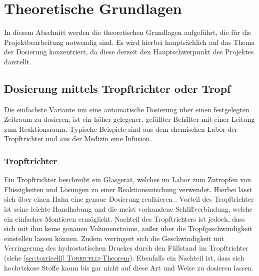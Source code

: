 \section{Theoretische Grundlagen}
\label{sec:physik}
In diesem Abschnitt werden die theoretischen Grundlagen aufgeführt, die für die Projektbearbeitung notwendig sind. Es wird hierbei hauptsächlich auf das Thema der Dosierung konzentriert, da diese derzeit den Hauptschwerpunkt des Projektes darstellt.

\subsection{Dosierung mittels Tropftrichter oder Tropf}
Die einfachste Variante um eine automatische Dosierung über einen festgelegten Zeitraum zu dosieren, ist ein höher gelegener, gefüllter Behälter mit einer Leitung zum Reaktionsraum. Typische Beispiele sind aus dem chemischen Labor der Tropftrichter und aus der Medizin eine Infusion. 

\subsubsection*{Tropftrichter}
Ein Tropftrichter beschreibt ein Glasgerät, welches im Labor zum Zutropfen von Flüssigkeiten und Lösungen zu einer Reaktionsmischung verwendet. Hierbei lässt sich über einen Hahn eine genaue Dosierung realisieren \cite{Hunig.2006}.
Vorteil des Tropftrichter ist seine leichte Handhabung und die meist vorhandene Schliffverbindung, welche ein einfaches Montieren ermöglicht.
Nachteil des Tropftrichters ist jedoch, dass sich mit ihm keine genauen Volumenströme, außer über die Tropfgeschwindigkeit einstellen lassen können. Zudem verringert sich die Geschwindigkeit mit Verringerung des hydrostatischen Druckes durch den Füllstand im Tropftrichter (siehe \hyperref[sec:torricelli]{\ref{sec:torricelli} \textsc{Torricelli}-Theorem}). Ebenfalls ein Nachteil ist, dass sich hochviskose Stoffe kaum bis gar nicht auf diese Art und Weise zu dosieren lassen.

